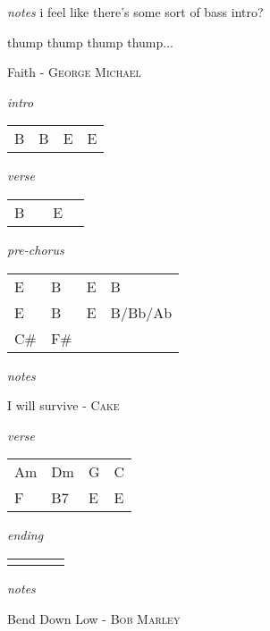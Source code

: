\documentclass[12pt]{article}
\begin{document}
\textit{notes}
i feel like there's some sort of bass intro?


thump thump thump thump...
\newpage

{\Huge Faith} {\huge - \textsc{George Michael}}

\huge
\textit{intro}

\begin{tabular}{|P{1.25in}|P{1.25in}|P{1.25in}|P{1.25in}|}
  B  & B  &  E &  E \\
\end{tabular}

\textit{verse}

\begin{tabular}{|P{1.25in}|P{1.25in}|P{1.25in}|P{1.25in}|}
  B  &   & E  &   \\
\end{tabular}

\textit{pre-chorus}

\begin{tabular}{|P{1.25in}|P{1.25in}|P{1.25in}|P{1.25in}|}
  E  & B  & E  &  B \\
  E  & B  & E &  B/Bb/Ab \\
  C# & F# & & \\
\end{tabular}

\textit{notes}

\newpage

{\Huge I will survive} {\huge - \textsc{Cake}}

\huge

\textit{verse}

\begin{tabular}{|P{1.25in}|P{1.25in}|P{1.25in}|P{1.25in}|}
  Am  &  Dm  & G  &  C \\
  F   &  B7  & E  &  E \\
\end{tabular}

\textit{ending}

\begin{tabular}{|P{1.25in}|P{1.25in}|P{1.25in}|P{1.25in}|}
    &   &   &   \\
\end{tabular}

\textit{notes}

\newpage


{\Huge Bend Down Low} {\huge - \textsc{Bob Marley}}
\end{document}
